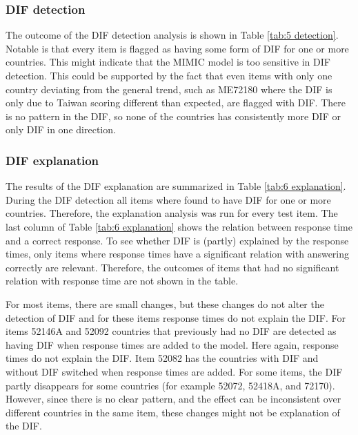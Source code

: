 \documentclass{interact}
\begin{document}
\newpage
\subsubsection{DIF detection}
The outcome of the DIF detection analysis is shown in Table \ref{tab:5 detection}. Notable is that every item is flagged as having some form of DIF for one or more countries. This might indicate that the MIMIC model is too sensitive in DIF detection. This could be supported by the fact that even items with only one country deviating from the general trend, such as ME72180 where the DIF is only due to Taiwan scoring different than expected, are flagged with DIF. There is no pattern in the DIF, so none of the countries has consistently more DIF or only DIF in one direction. 

\subsubsection{DIF explanation}
The results of the DIF explanation are summarized in Table \ref{tab:6 explanation}. During the DIF detection all items where found to have DIF for one or more countries. Therefore, the explanation analysis was run for every test item. The last column of Table \ref{tab:6 explanation} shows the relation between response time and a correct response. To see whether DIF is (partly) explained by the response times, only items where response times have a significant relation with answering correctly are relevant. Therefore, the outcomes of items that had no significant relation with response time are not shown in the table. 

For most items, there are small changes, but these changes do not alter the detection of DIF and for these items response times do not explain the DIF. For items 52146A and 52092 countries that previously had no DIF are detected as having DIF when response times are added to the model. Here again, response times do not explain the DIF. Item 52082 has the countries with DIF and without DIF switched when response times are added. For some items, the DIF partly disappears for some countries (for example 52072, 52418A, and 72170). However, since there is no clear pattern, and the effect can be inconsistent over different countries in the same item, these changes might not be explanation of the DIF.
\end{document}
